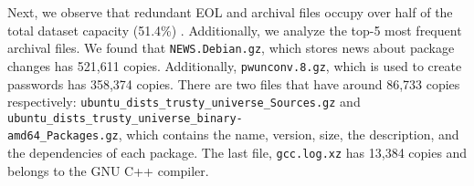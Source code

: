 Next, we observe that redundant EOL and archival files occupy over half of the
total dataset
capacity (51.4\%) .
%
%
Additionally, we analyze the top-5 most frequent archival files.
We found that \texttt{NEWS.Debian.gz}, which stores news
about package changes has 521,611 copies.
Additionally, \texttt{pwunconv.8.gz}, which is used to create passwords
has 358,374 copies.
There are two files that have around 86,733 copies respectively:
\texttt{ubuntu\_dists\_trusty\_universe\_Sources.gz} and
\texttt{ubuntu\_dists\_trusty\_universe\_binary-\\amd64\_Packages.gz}, which
contains the name, version, size, the description, and the dependencies of each package.
%
The last file, \texttt{gcc.log.xz} has 13,384 copies and belongs to the GNU C++ compiler.
%
%
%
%
%
 

%
%

